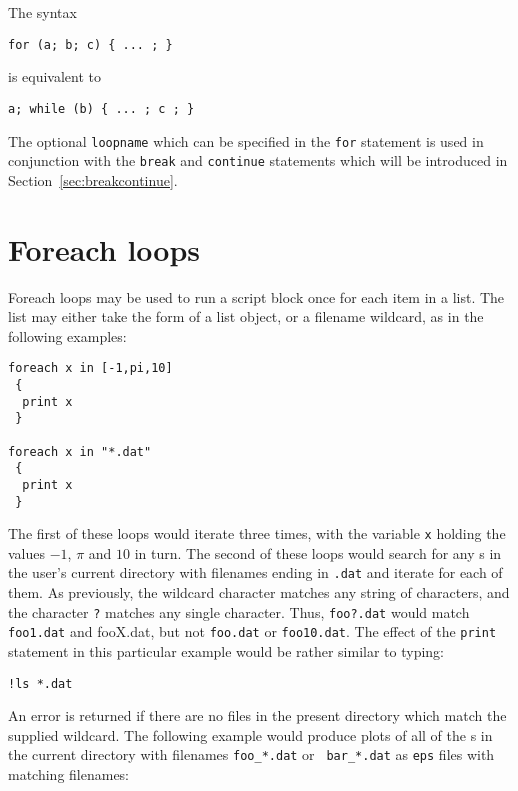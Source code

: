 The syntax

\begin{verbatim}
for (a; b; c) { ... ; }
\end{verbatim}

is equivalent to

\begin{verbatim}
a; while (b) { ... ; c ; }
\end{verbatim}

The optional {\tt loopname} which can be specified in the {\tt for} statement
is used in conjunction with the {\tt break} and {\tt continue} statements which
will be introduced in Section~\ref{sec:breakcontinue}.

\section{Foreach loops}

Foreach loops may be used to run a script block once for each item in a list.
The list may either take the form of a list object, or a filename wildcard, as
in the following examples:

\begin{verbatim}
foreach x in [-1,pi,10]
 {
  print x
 }

foreach x in "*.dat"
 {
  print x
 }
\end{verbatim}

The first of these loops would iterate three times, with the variable {\tt x}
holding the values $-1$, $\pi$ and $10$ in turn. The second of these loops
would search for any \datafile s in the user's current directory with filenames
ending in {\tt .dat} and iterate for each of them. As previously, the wildcard
character {\tt *} matches any string of characters, and the character {\tt ?}
matches any single character. Thus, {\tt foo?.dat} would match {\tt foo1.dat}
and {fooX.dat}, but not {\tt foo.dat} or {\tt foo10.dat}. The effect of the
{\tt print} statement in this particular example would be rather similar to
typing:

\begin{verbatim}
!ls *.dat
\end{verbatim}

An error is returned if there are no files in the present directory which match
the supplied wildcard. The following example would produce plots of all of the
\datafile s in the current directory with filenames {\tt foo\_*.dat} or {\tt
bar\_*.dat} as {\tt eps} files with matching filenames:

